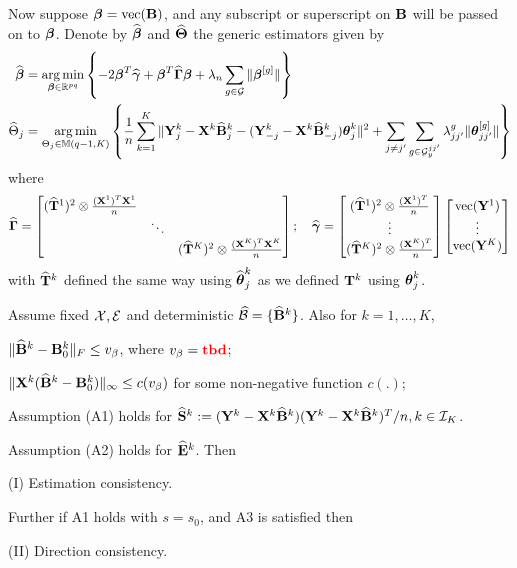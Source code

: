 \documentclass[fleqn,11pt]{article}
\DeclareMathOperator*{\ve}{vec}
\DeclareMathOperator*{\argmin}{arg\,min}
\numberwithin{equation}{section}
\begin{document}
Now suppose $\bfbeta = \ve (\bfB)$, and any subscript or superscript on ${\mathbf{B}}$ will be passed on to ${\boldsymbol{\beta}}$. Denote by $\widehat {{\boldsymbol{\beta}}}$ and $\widehat {{\boldsymbol{\Theta}}}$ the generic estimators given by
%
\begin{align}
\widehat \bfbeta &= \argmin_{\bfbeta \in \BR^{pq}} \left\{-2 \bfbeta^T \widehat \bfgamma + \bfbeta^T \widehat \bfGamma \bfbeta + \lambda_n \sum_{g \in \cG} \| \bfbeta^{[g]}  \| \right\} \\
\widehat \Theta_j &= \argmin_{\Theta_j \in \BM(q-1, K)} \left\{ \frac{1}{n} \sum_{k=1}^K \| \bfY^k_j - \bfX^k \widehat \bfB_j^k - (\bfY_{-j}^k - \bfX^k \widehat \bfB^k_{-j} ) \bftheta_j^k \|^2 + \sum_{j \neq j'} \sum_{g \in \cG_y^{jj'}} \lambda_{jj'}^g \| \bftheta_{jj'}^{[g]} \| \right\}
\end{align}
%
where
%
$$
\widehat \bfGamma = \begin{bmatrix}
(\widehat \bfT^1)^2 \otimes \frac{(\bfX^1)^T \bfX^1}{n} & &\\
& \ddots &\\
& & (\widehat \bfT^K)^2 \otimes \frac{(\bfX^K)^T \bfX^K}{n}
\end{bmatrix}; \quad
\widehat \bfgamma = \begin{bmatrix}
(\widehat \bfT^1)^2 \otimes \frac{(\bfX^1)^T}{n}\\
\vdots\\
(\widehat \bfT^K)^2 \otimes \frac{(\bfX^K)^T}{n}
\end{bmatrix}
\begin{bmatrix}
\ve (\bfY^1)\\
\vdots\\
\ve (\bfY^K)
\end{bmatrix}
$$
with $\widehat {{\mathbf{T}}}^k$ defined the same way using $\widehat {{\boldsymbol{\theta}}}_j^k$ as we defined ${\mathbf{T}}^k$ using ${\boldsymbol{\theta}}_j^k$.
\begin{Theorem}\label{thm:ThetaThm}
Assume fixed ${\cal{X}}, {\cal{E}}$ and deterministic $\widehat {{\cal{B}}} = \{ \widehat {{\mathbf{B}}}^k \}$. Also for $k = 1, \ldots, K$,

 $\| \widehat {{\mathbf{B}}}^k - {\mathbf{B}}^k_0 \|_F \leq v_\beta$, where $v_\beta = {\color{red} \bf tbd}$;

 $\| {\mathbf{X}}^k (\widehat {{\mathbf{B}}}^k - {\mathbf{B}}^k_0 ) \|_\infty \leq c(v_\beta)$ for some non-negative function $c(.)$;

 Assumption (A1) holds for $\widehat {{\mathbf{S}}}^k := ({\mathbf{Y}}^k - {\mathbf{X}}^k \widehat {{\mathbf{B}}}^k)({\mathbf{Y}}^k - {\mathbf{X}}^k \widehat {{\mathbf{B}}}^k)^T/n, k \in {\cal{I}}_K$.

 Assumption (A2) holds for $\widehat {{\mathbf{E}}}^k$. Then

(I) Estimation consistency.

Further if A1 holds with $s = s_0$, and A3 is satisfied then

(II) Direction consistency.
\end{Theorem}
\end{document}
